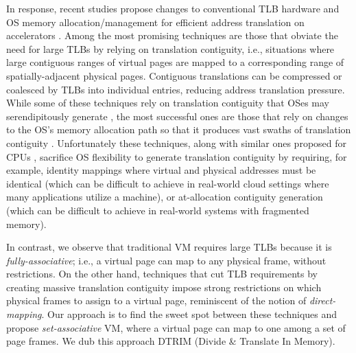 In response, recent studies propose changes to conventional TLB
hardware and OS memory allocation/management for efficient address
translation on accelerators \cite{pichai:architectural,
  power:supporting, ausavarungnirun:mosaic}. Among the most promising
techniques are those that obviate the need for large TLBs by relying
on translation contiguity, i.e., situations where large contiguous
ranges of virtual pages are mapped to a corresponding range of
spatially-adjacent physical pages. Contiguous translations can be
compressed or coalesced by TLBs into individual entries, reducing
address translation pressure. While some of these techniques rely on
translation contiguity that OSes may serendipitously generate
\cite{pham:colt, bhattacharjee:large-reach, cox:efficient,
  pham:increasing}, the most successful ones are those that rely on
changes to the OS's memory allocation path so that it produces vast
swaths of translation contiguity
\cite{haria:devirtualizing}. Unfortunately these techniques, along
with similar ones proposed for CPUs \cite{basu:efficient,
  gandhi:range}, sacrifice OS flexibility to generate translation
contiguity by requiring, for example, identity mappings where virtual
and physical addresses must be identical (which can be difficult to
achieve in real-world cloud settings where many applications utilize a
machine), or at-allocation contiguity generation (which can be
difficult to achieve in real-world systems with fragmented
memory). %

In contrast, we observe that traditional VM requires large
TLBs because it is {\it fully-associative}; i.e., a virtual page can
map to any physical frame, without restrictions. On the other hand, techniques that cut TLB
requirements by creating massive translation contiguity
\cite{basu:efficient, gandhi:range, haria:devirtualizing} impose
strong restrictions on which physical frames to assign to a virtual
page, reminiscent of the notion of {\it direct-mapping}. Our approach
is to find the sweet spot between these techniques and propose {\it
  set-associative} VM, where a virtual page can map to one among a set
of page frames. We dub this approach DTRIM (Divide \& Translate In Memory). 

